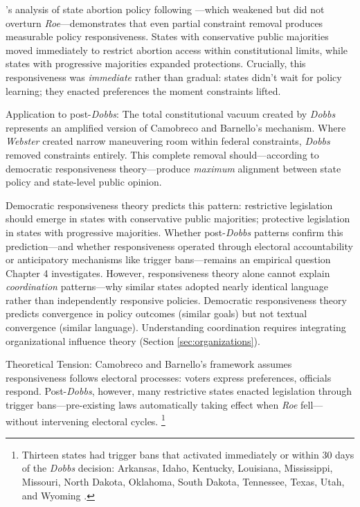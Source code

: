 \textcite[pp.~443--445]{camobrecoDemocraticResponsivenessPolicy2008}'s analysis of state abortion policy following \textcite{webster1989}---which weakened but did not overturn \textit{Roe}---demonstrates that even partial constraint removal produces measurable policy responsiveness. States with conservative public majorities moved immediately to restrict abortion access within constitutional limits, while states with progressive majorities expanded protections. Crucially, this responsiveness was \textit{immediate} rather than gradual: states didn't wait for policy learning; they enacted preferences the moment constraints lifted.

Application to post-\textit{Dobbs}: The total constitutional vacuum created by \textit{Dobbs} represents an amplified version of Camobreco and Barnello's mechanism. Where \textit{Webster} created narrow maneuvering room within federal constraints, \textit{Dobbs} removed constraints entirely. This complete removal should---according to democratic responsiveness theory---produce \textit{maximum} alignment between state policy and state-level public opinion.

Democratic responsiveness theory predicts this pattern: restrictive legislation should emerge in states with conservative public majorities; protective legislation in states with progressive majorities. Whether post-\textit{Dobbs} patterns confirm this prediction---and whether responsiveness operated through electoral accountability or anticipatory mechanisms like trigger bans---remains an empirical question Chapter 4 investigates. However, responsiveness theory alone cannot explain \textit{coordination} patterns---why similar states adopted nearly identical language rather than independently responsive policies. Democratic responsiveness theory predicts convergence in policy outcomes (similar goals) but not textual convergence (similar language). Understanding coordination requires integrating organizational influence theory (Section \ref{sec:organizations}).

Theoretical Tension: Camobreco and Barnello's framework assumes responsiveness follows electoral processes: voters express preferences, officials respond. Post-\textit{Dobbs}, however, many restrictive states enacted legislation through trigger bans---pre-existing laws automatically taking effect when \textit{Roe} fell---without intervening electoral cycles. \footnote{Thirteen states had trigger bans that activated immediately or within 30 days of the \textit{Dobbs} decision: Arkansas, Idaho, Kentucky, Louisiana, Mississippi, Missouri, North Dakota, Oklahoma, South Dakota, Tennessee, Texas, Utah, and Wyoming \parencite{nash13StatesHave2022}.}

